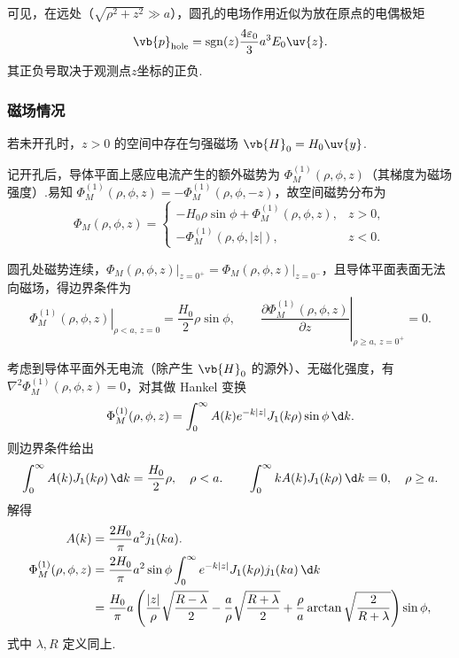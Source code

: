可见，在远处（\(\sqrt{\rho^2+z^2} \gg a\)），圆孔的电场作用近似为放在原点的电偶极矩
\begin{equation*}
	\vb{p}_{\text{hole}} = \operatorname{sgn}(z) \frac{4\varepsilon_0}{3} a^3 E_0 \uv{z}.
\end{equation*}
其正负号取决于观测点\(z\)坐标的正负.

\subsubsection{磁场情况}
若未开孔时，\(z > 0\) 的空间中存在匀强磁场 \(\vb{H}_0 = H_0 \uv{y}\).

记开孔后，导体平面上感应电流产生的额外磁势为 \(\Phi_M^{(1)}(\rho, \phi, z)\)（其梯度为磁场强度）.易知 \(\Phi_M^{(1)}(\rho, \phi, z) = -\Phi_M^{(1)}(\rho, \phi, -z)\)，故空间磁势分布为
\begin{equation*}
	\Phi_M(\rho, \phi, z) =
	\begin{cases}
		-H_0 \rho \sin\phi + \Phi_M^{(1)}(\rho, \phi, z), & z > 0, \\[4pt]
		-\Phi_M^{(1)}(\rho, \phi, |z|),                   & z < 0.
	\end{cases}
\end{equation*}

圆孔处磁势连续，\(\left.\Phi_M(\rho, \phi, z)\right|_{z=0^+} = \left.\Phi_M(\rho, \phi, z)\right|_{z=0^-}\)，且导体平面表面无法向磁场，得边界条件为
\begin{equation*}
	\left.\Phi_M^{(1)}(\rho, \phi, z)\right|_{\rho < a,\, z=0} = \frac{H_0}{2} \rho \sin\phi, \qquad
	\left.\frac{\partial \Phi_M^{(1)}(\rho, \phi, z)}{\partial z}\right|_{\rho \ge a,\, z=0^+} = 0.
\end{equation*}

考虑到导体平面外无电流（除产生 \(\vb{H}_0\) 的源外）、无磁化强度，有\(\nabla^2 \Phi_M^{(1)}(\rho, \phi, z) = 0\)，对其做 Hankel 变换
\begin{equation*}
	\Phi_M^{(1)}(\rho, \phi, z) = \int_0^\infty A(k) e^{-k|z|} J_1(k\rho) \sin\phi \,\d k.
\end{equation*}
则边界条件给出
\begin{equation*}
	\int_0^\infty A(k) J_1(k\rho) \,\d k = \frac{H_0}{2} \rho, \quad \rho < a. \qquad
	\int_0^\infty k A(k) J_1(k\rho) \,\d k = 0, \quad \rho \ge a.
\end{equation*}
解得
\begin{align*}
	A(k) & = \frac{2H_0}{\pi} a^2 j_1(ka).                                                                                                                                                         \\
	\Phi_M^{(1)}(\rho, \phi, z)
	     & = \frac{2H_0}{\pi} a^2 \sin\phi \int_0^\infty e^{-k|z|} J_1(k\rho) j_1(ka) \,\d k                                                                                                       \\
	     & = \frac{H_0}{\pi} a \left( \frac{|z|}{\rho} \sqrt{\frac{R-\lambda}{2}} - \frac{a}{\rho} \sqrt{\frac{R+\lambda}{2}} + \frac{\rho}{a} \arctan\sqrt{\frac{2}{R+\lambda}} \right) \sin\phi,
\end{align*}
式中 \(\lambda, R\) 定义同上.

